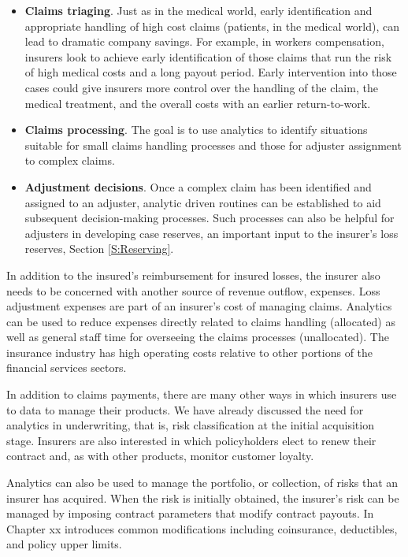 \documentclass[]{book}
\begin{document}
\begin{itemize}
\item
  \textbf{Claims triaging}. Just as in the medical world, early
  identification and appropriate handling of high cost claims (patients,
  in the medical world), can lead to dramatic company savings. For
  example, in workers compensation, insurers look to achieve early
  identification of those claims that run the risk of high medical costs
  and a long payout period. Early intervention into those cases could
  give insurers more control over the handling of the claim, the medical
  treatment, and the overall costs with an earlier return-to-work.
\item
  \textbf{Claims processing}. The goal is to use analytics to identify
  situations suitable for small claims handling processes and those for
  adjuster assignment to complex claims.
\item
  \textbf{Adjustment decisions}. Once a complex claim has been
  identified and assigned to an adjuster, analytic driven routines can
  be established to aid subsequent decision-making processes. Such
  processes can also be helpful for adjusters in developing case
  reserves, an important input to the insurer's loss reserves, Section
  \ref{S:Reserving}.
\end{itemize}

In addition to the insured's reimbursement for insured losses, the
insurer also needs to be concerned with another source of revenue
outflow, expenses. Loss adjustment expenses are part of an insurer's
cost of managing claims. Analytics can be used to reduce expenses
directly related to claims handling (allocated) as well as general staff
time for overseeing the claims processes (unallocated). The insurance
industry has high operating costs relative to other portions of the
financial services sectors.

In addition to claims payments, there are many other ways in which
insurers use to data to manage their products. We have already discussed
the need for analytics in underwriting, that is, risk classification at
the initial acquisition stage. Insurers are also interested in which
policyholders elect to renew their contract and, as with other products,
monitor customer loyalty.

Analytics can also be used to manage the portfolio, or collection, of
risks that an insurer has acquired. When the risk is initially obtained,
the insurer's risk can be managed by imposing contract parameters that
modify contract payouts. In Chapter xx introduces common modifications
including coinsurance, deductibles, and policy upper limits.
\end{document}
